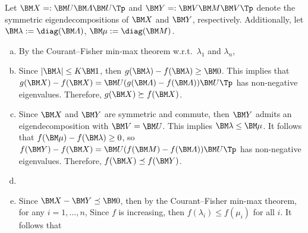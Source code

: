 \begin{problem*}[Exercise 5.4.5]\label{ex5.4.5}

\end{problem*}
\begin{answer}
Let $\BM X=:\BM U\BM\varLambda\BM U\Tp$ and $\BM Y=:\BM V\BM M\BM V\Tp$ denote the symmetric eigendecompositions of $\BM X$ and $\BM Y$, respectively. Additionally, let $\BM\lambda:=\diag(\BM\varLambda)$, $\BM\mu:=\diag(\BM M)$.

\begin{enumerate}[(a)]
\item
By the Courant--Fisher min-max theorem w.r.t.\ $\lambda_1$ and $\lambda_n$,

\item
Since $|\BM\lambda|\le K\BM1$, then $g(\BM\lambda)-f(\BM\lambda)\ge\BM0$. This implies that $g(\BM X)-f(\BM X)=\BM U(g(\BM\varLambda)-f(\BM\varLambda))\BM U\Tp$ has non-negative eigenvalues. Therefore, $g(\BM X)\succeq f(\BM X)$.

\item
Since $\BM X$ and $\BM Y$ are symmetric and commute, then $\BM Y$ admits an eigendecomposition with $\BM V=\BM U$. This implies $\BM\lambda\le\BM\mu$. It follows that $f(\BM\mu)-f(\BM\lambda)\ge0$, so
$f(\BM Y)-f(\BM X)=\BM U(f(\BM M)-f(\BM\varLambda))\BM U\Tp$ has non-negative eigenvalues. Therefore, $f(\BM X)\preceq f(\BM Y)$.

\item
{}

\item
Since $\BM X-\BM Y\preceq\BM0$, then by the Courant--Fisher min-max theorem, for any $i=1,\dots,n$,
Since $f$ is increasing, then $f(\lambda_i)\le f(\mu_i)$ for all $i$. It follows that


\end{enumerate}
\end{answer}
